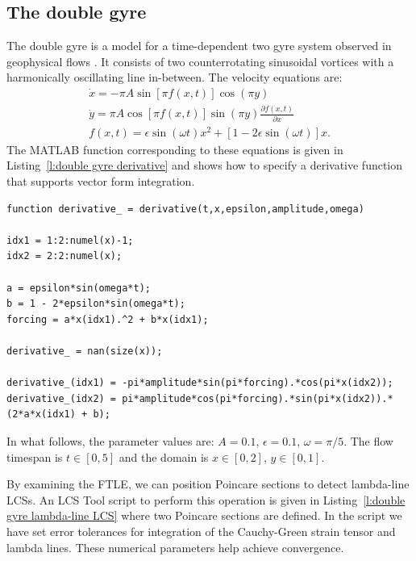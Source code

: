 \documentclass{article}
\begin{document}
\subsection{The double gyre}
The double gyre is a model for a time-dependent two gyre system observed in geophysical flows \parencite{shadden05:_defin_lagran_lyapun}. It consists of two counterrotating sinusoidal vortices with a harmonically oscillating line in-between. The velocity equations are:
\begin{equation}
\begin{split}
\dot x = -\pi A \sin[\pi f(x,t)] \cos(\pi y)\\
\dot y = \pi A \cos[\pi f(x,t)] \sin(\pi y) \frac{\partial f(x,t)}{\partial x}\\
f(x,t) = \epsilon \sin(\omega t) x^2 + [1 - 2 \epsilon \sin(\omega t)] x.
\end{split}
\label{eq:double gyre derivative equations}
\end{equation}
The MATLAB function corresponding to these equations is given in Listing~\ref{l:double gyre derivative} and shows how to specify a derivative function that supports vector form integration.

\begin{lstlisting}[caption={Double gyre derivative function corresponding to Equations~\ref{eq:double gyre derivative equations}.},label=l:double gyre derivative]
function derivative_ = derivative(t,x,epsilon,amplitude,omega)

idx1 = 1:2:numel(x)-1;
idx2 = 2:2:numel(x);

a = epsilon*sin(omega*t);
b = 1 - 2*epsilon*sin(omega*t);
forcing = a*x(idx1).^2 + b*x(idx1);

derivative_ = nan(size(x));

derivative_(idx1) = -pi*amplitude*sin(pi*forcing).*cos(pi*x(idx2));
derivative_(idx2) = pi*amplitude*cos(pi*forcing).*sin(pi*x(idx2)).*(2*a*x(idx1) + b);
\end{lstlisting}

In what follows, the parameter values are: $A = 0.1$, $\epsilon = 0.1$, $\omega = \pi/5$. The flow timespan is $t \in [0,5]$ and the domain is $x \in [0,2]$, $y \in [0,1]$.

By examining the FTLE, we can position Poincare sections to detect lambda-line LCSs. An LCS Tool script to perform this operation is given in Listing~\ref{l:double gyre lambda-line LCS} where two Poincare sections are defined. In the script we have set error tolerances for integration of the Cauchy-Green strain tensor and lambda lines. These numerical parameters help achieve convergence.
\end{document}
